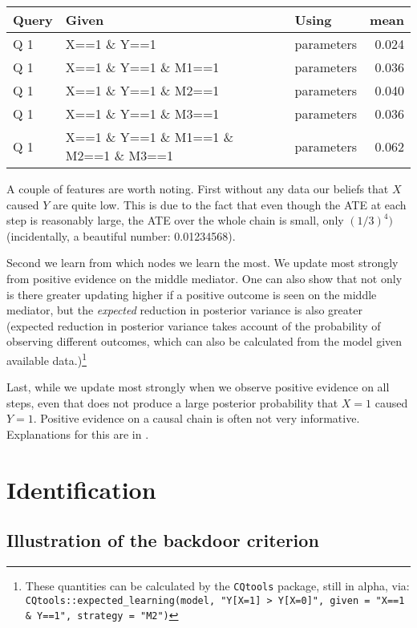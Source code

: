 \documentclass[
  12pt,
]{book}
\begin{document}
\begin{tabular}{l|l|l|r}
\hline
Query & Given & Using & mean\\
\hline
Q 1 & X==1 \& Y==1 & parameters & 0.024\\
\hline
Q 1 & X==1 \& Y==1 \& M1==1 & parameters & 0.036\\
\hline
Q 1 & X==1 \& Y==1 \& M2==1 & parameters & 0.040\\
\hline
Q 1 & X==1 \& Y==1 \& M3==1 & parameters & 0.036\\
\hline
Q 1 & X==1 \& Y==1 \& M1==1 \& M2==1 \& M3==1 & parameters & 0.062\\
\hline
\end{tabular}

A couple of features are worth noting. First without any data our beliefs that \(X\) caused \(Y\) are quite low. This is due to the fact that even though the ATE at each step is reasonably large, the ATE over the whole chain is small, only \((1/3)^4)\) (incidentally, a beautiful number: 0.01234568).

Second we learn from which nodes we learn the most. We update most strongly from positive evidence on the middle mediator. One can also show that not only is there greater updating higher if a positive outcome is seen on the middle mediator, but the \emph{expected} reduction in posterior variance is also greater (expected reduction in posterior variance takes account of the probability of observing different outcomes, which can also be calculated from the model given available data.)\footnote{These quantities can be calculated by the \texttt{CQtools} package, still in alpha, via: \texttt{CQtools::expected\_learning(model,\ "Y{[}X=1{]}\ \textgreater{}\ Y{[}X=0{]}",\ given\ =\ "X==1\ \&\ Y==1",\ strategy\ =\ "M2")}}

Last, while we update most strongly when we observe positive evidence on all steps, even that does not produce a large posterior probability that \(X=1\) caused \(Y=1\). Positive evidence on a causal chain is often not very informative. Explanations for this are in \citet{dawid2019bounding}.

\hypertarget{identification}{%
\chapter{Identification}\label{identification}}

\hypertarget{illustration-of-the-backdoor-criterion}{%
\section{Illustration of the backdoor criterion}\label{illustration-of-the-backdoor-criterion}}
\end{document}
